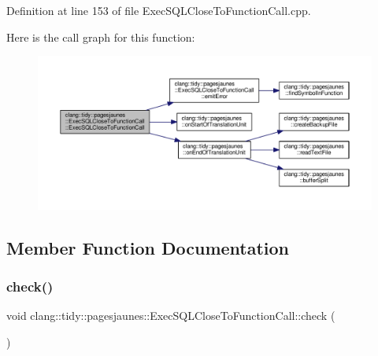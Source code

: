 Definition at line 153 of file Exec\+S\+Q\+L\+Close\+To\+Function\+Call.\+cpp.

Here is the call graph for this function\+:
\nopagebreak
\begin{figure}[H]
\begin{center}
\leavevmode
\includegraphics[width=350pt]{classclang_1_1tidy_1_1pagesjaunes_1_1_exec_s_q_l_close_to_function_call_aba6dcb92a554c560136ecd20adc9bc53_cgraph}
\end{center}
\end{figure}


\subsection{Member Function Documentation}
\mbox{\label{classclang_1_1tidy_1_1pagesjaunes_1_1_exec_s_q_l_close_to_function_call_a1906033d14542dee9278065f2d7daa6a}} 
\subsubsection{\texorpdfstring{check()}{check()}}
{\footnotesize\ttfamily void clang\+::tidy\+::pagesjaunes\+::\+Exec\+S\+Q\+L\+Close\+To\+Function\+Call\+::check (\begin{DoxyParamCaption}\item[{const ast\+\_\+matchers\+::\+Match\+Finder\+::\+Match\+Result \&}]{ }\end{DoxyParamCaption})\hspace{0.3cm}{\ttfamily [override]}}




